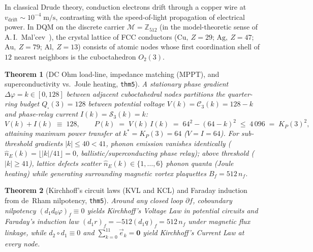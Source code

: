 \documentclass[11pt,a4paper]{article}
\newtheorem{theorem}{Theorem}[section]
\theoremstyle{definition}
\theoremstyle{remark}
\begin{document}
In classical Drude theory, conduction electrons drift through a copper wire at $v_{\mathrm{drift}} \sim 10^{-4}\;\text{m/s}$, contrasting with the speed-of-light propagation of electrical power. In DQM on the discrete carrier $\mathcal{M} = \mathbb{Z}_{512}$ (in the model-theoretic sense of A.\,I.~Mal'cev~\cite{Malcev1973}), the crystal lattice of FCC conductors ($\mathrm{Cu},\ Z=29$; $\mathrm{Ag},\ Z=47$; $\mathrm{Au},\ Z=79$; $\mathrm{Al},\ Z=13$) consists of atomic nodes whose first coordination shell of $12$ nearest neighbors is the cuboctahedron $O_2(3)$.

\begin{theorem}[DC Ohm load-line, impedance matching (MPPT), and superconductivity vs.\ Joule heating, \texttt{thm5}]
\label{thm:dc-ohm-mppt}
A stationary phase gradient $\Delta\varphi = k \in [0,128]$ between adjacent cuboctahedral nodes partitions the quarter-ring budget $Q_\square(3) = 128$ between potential voltage $V(k) = \mathcal{C}_3(k) = 128 - k$ and phase-relay current $I(k) = \mathcal{S}_3(k) = k$:
\begin{equation}
  \label{eq:dc-ohm-mppt}
  V(k) + I(k) \;\equiv\; 128, \qquad
  P(k) \;=\; V(k)\,I(k) \;=\; 64^2 - (64 - k)^2 \;\le\; 4\,096 \;=\; K_P(3)^2,
\end{equation}
attaining maximum power transfer at $k^* = K_P(3) = 64$ ($V = I = 64$). For sub-threshold gradients $|k| \le 40 < 41$, phonon emission vanishes identically ($\hat{n}_E(k) = \lfloor|k|/41\rfloor = 0$, ballistic/superconducting phase relay); above threshold ($|k| \ge 41$), lattice defects scatter $\hat{n}_E(k) \in \{1,\dots,6\}$ phonon quanta (Joule heating) while generating surrounding magnetic vortex plaquettes $B_f = 512\,n_f$.
\end{theorem}

\begin{theorem}[Kirchhoff's circuit laws (KVL and KCL) and Faraday induction from de~Rham nilpotency, \texttt{thm5}]
\label{thm:kirchhoff-faraday}
Around any closed loop $\partial f$, coboundary nilpotency $(d_1 d_0\varphi)_f \equiv 0$ yields Kirchhoff's Voltage Law in potential circuits and Faraday's induction law $(d_1 r)_f = -512(d_1 q)_f = 512\,n_f$ under magnetic flux linkage, while $d_2\circ d_1 \equiv 0$ and $\sum_{k=0}^{11}\vec{e}_k = \mathbf{0}$ yield Kirchhoff's Current Law at every node.
\end{theorem}
\end{document}
